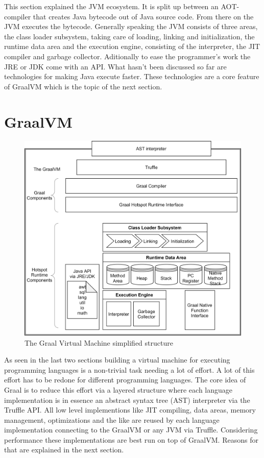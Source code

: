This section explained the JVM ecosystem. It is split up between an AOT-compiler that creates Java bytecode out of Java source code. From there on the JVM executes the bytecode. Generally speaking the JVM consists of three areas, the class loader subsystem, taking care of loading, linking and initialization, the runtime data area and the execution engine, consisting of the interpreter, the JIT compiler and garbage collector. Aditionally to ease the programmer's work the JRE or JDK come with an API. What hasn't been discussed so far are technologies for making Java execute faster. These technologies are a core feature of GraalVM which is the topic of the next section.
\section{GraalVM}
\begin{figure}
	\includegraphics[scale=0.2]{../figures/GraalVM.png}
	\caption{The Graal Virtual Machine simplified structure}
	\label{fig:graalvm}
\end{figure}
As seen in the last two sections building a virtual machine for executing programming languages is a non-trivial task needing a lot of effort. A lot of this effort has to be redone for different programming languages. The core idea of Graal is to reduce this effort via a layered structure where each language implementation is in essence an abstract syntax tree (AST) interpreter via the Truffle API. All low level implementions like JIT compiling, data areas, memory management, optimizations and the like are reused by each language implementation connecting to the GraalVM or any JVM via Truffle. Considering performance these implementations are best run on top of GraalVM. Reasons for that are explained in the next section.\\
